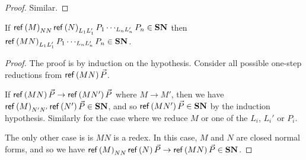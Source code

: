 \begin{proof}
Similar.
\end{proof}

\begin{lemma}
\label{lm:SNred1}
If $\mathsf{ref} \left( {M} \right)_{NN} \mathsf{ref} \left( {N} \right)_{L_1 L_1'} P_1 \cdots_{L_n L_n'} P_n \in \mathbf{SN}$ then $\mathsf{ref} \left( {MN} \right)_{L_1 L_1'} P_1 \cdots_{L_n L_n'} P_n \in \mathbf{SN}$.
\end{lemma}

\begin{proof}
The proof is by induction on the hypothesis.  Consider all possible one-step reductions from $\mathsf{ref} \left( {MN} \right) \vec{P}$.

If $\mathsf{ref} \left( {MN} \right) \vec{P} \rightarrow \mathsf{ref} \left( {MN'} \right) \vec{P}$ where $M \rightarrow M'$, then we have $\mathsf{ref} \left( {M} \right)_{N' N'} \mathsf{ref} \left( {N'} \right) \vec{P} \in \mathbf{SN}$, and so
$\mathsf{ref} \left( {MN'} \right) \vec{P} \in \mathbf{SN}$ by the induction hypothesis.  Similarly for the case where we reduce $M$ or one of the $L_i$, $L_i'$ or $P_i$.

The only other case is is $MN$ is a redex.  In this case, $M$ and $N$ are closed normal forms, and so we have $\mathsf{ref} \left( {M} \right)_{NN} \mathsf{ref} \left( {N} \right) \vec{P} \rightarrow \mathsf{ref} \left( {MN} \right) \vec{P} \in \mathbf{SN}$.
\end{proof}
